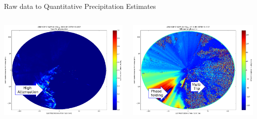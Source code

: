 \documentclass[final]{beamer}
\begin{document}
\begin{frame}{}
\begin{columns}[t]
\begin{column}{.3\linewidth}
\begin{block}{Raw data to Quantitative Precipitation Estimates}
\begin{columns}[t]
\begin{column}{.6\linewidth}
\begin{columns}[t]
\begin{column}{.5\linewidth}
			\includegraphics[width=.95\linewidth]{figures/speca.png}\\[1ex]  
		\end{column}
		 \begin{column}{.5\linewidth}
                		\includegraphics[width=.95\linewidth]{figures/phidp.png}\\[1ex] %

\end{column}
\end{columns}
\end{column}
\end{columns}
\end{block}
\end{column}
\end{columns}
\end{frame}
\end{document}
